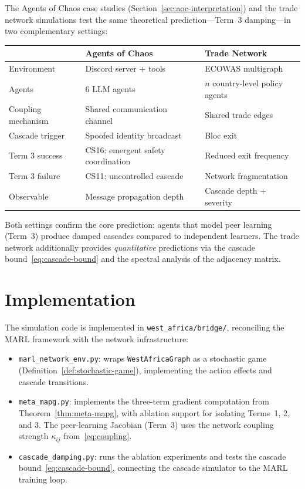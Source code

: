 The Agents of Chaos case studies (Section~\ref{sec:aoc-interpretation}) and the trade network simulations test the same theoretical prediction---Term~3 damping---in two complementary settings:

\begin{center}
\begin{tabular}{lll}
  \hline
  & \textbf{Agents of Chaos} & \textbf{Trade Network} \\
  \hline
  Environment & Discord server + tools & ECOWAS multigraph \\
  Agents & 6 LLM agents & $n$ country-level policy agents \\
  Coupling mechanism & Shared communication channel & Shared trade edges \\
  Cascade trigger & Spoofed identity broadcast & Bloc exit \\
  Term 3 success & CS16: emergent safety coordination & Reduced exit frequency \\
  Term 3 failure & CS11: uncontrolled cascade & Network fragmentation \\
  Observable & Message propagation depth & Cascade depth + severity \\
  \hline
\end{tabular}
\end{center}

Both settings confirm the core prediction: agents that model peer learning (Term~3) produce damped cascades compared to independent learners. The trade network additionally provides \emph{quantitative} predictions via the cascade bound~\eqref{eq:cascade-bound} and the spectral analysis of the adjacency matrix.

\section{Implementation}
\label{sec:implementation}

The simulation code is implemented in \texttt{west\_africa/bridge/}, reconciling the MARL framework with the network infrastructure:

\begin{itemize}
  \item \texttt{marl\_network\_env.py}: wraps \texttt{WestAfricaGraph} as a stochastic game (Definition~\ref{def:stochastic-game}), implementing the action effects and cascade transitions.
  \item \texttt{meta\_mapg.py}: implements the three-term gradient computation from Theorem~\ref{thm:meta-mapg}, with ablation support for isolating Terms~1, 2, and 3. The peer-learning Jacobian (Term~3) uses the network coupling strength $\kappa_{ij}$ from~\eqref{eq:coupling}.
  \item \texttt{cascade\_damping.py}: runs the ablation experiments and tests the cascade bound~\eqref{eq:cascade-bound}, connecting the cascade simulator to the MARL training loop.
\end{itemize}

